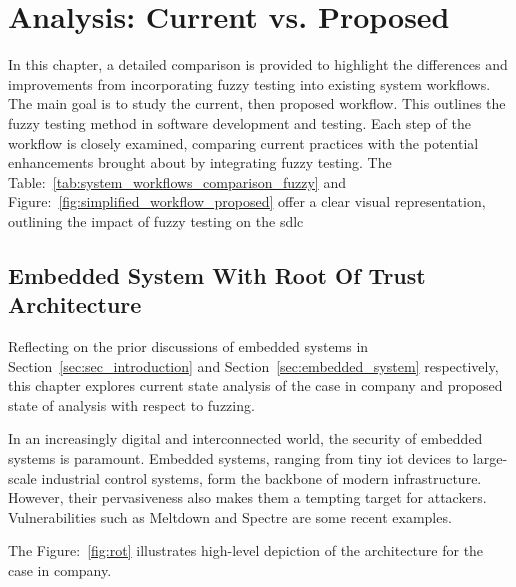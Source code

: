 \vspace{21.5pt}
\chapter{Analysis: Current vs. Proposed}
In this chapter, a detailed comparison is provided to highlight the differences
and improvements from incorporating fuzzy testing into existing system workflows.
The main goal is to study the current, then proposed workflow. This outlines the
fuzzy testing method in software development and testing. Each step of the workflow
is closely examined, comparing current practices with the potential enhancements
brought about by integrating fuzzy testing. The Table:~\ref{tab:system_workflows_comparison_fuzzy}
and Figure:~\ref{fig:simplified_workflow_proposed} offer a clear visual representation,
outlining the impact of fuzzy testing on the \acrlong{sdlc}

\section{Embedded System With Root Of Trust Architecture}
Reflecting on the prior discussions of embedded systems in
Section~\ref{sec:sec_introduction} and Section~\ref{sec:embedded_system} respectively,
this chapter explores current state analysis of the case in company and proposed
state of analysis with respect to fuzzing.

In an increasingly digital and interconnected world, the security of
embedded systems is paramount. Embedded systems, ranging from tiny
\gls{iot} devices to large-scale industrial control
systems, form the backbone of modern infrastructure. However,
their pervasiveness also makes them a tempting target for attackers. Vulnerabilities such as
Meltdown\cite{lipp2020meltdown} and Spectre\cite{kocher2020spectre} are some recent examples.

The Figure:~\ref{fig:rot} illustrates high-level depiction of the architecture for
the case in company.

